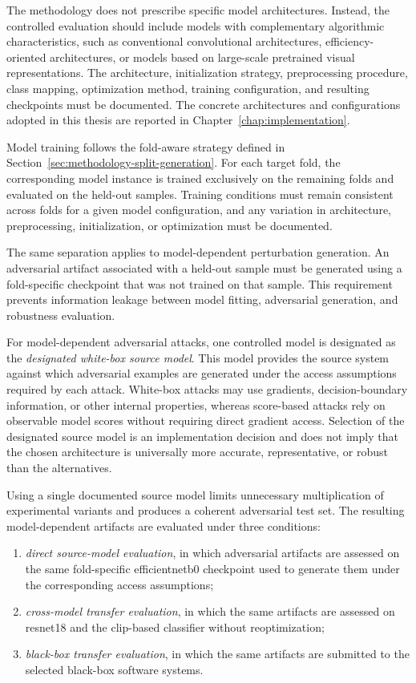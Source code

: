 The methodology does not prescribe specific model architectures. Instead, the
controlled evaluation should include models with complementary algorithmic
characteristics, such as conventional convolutional architectures,
efficiency-oriented architectures, or models based on large-scale pretrained
visual representations. The architecture, initialization strategy,
preprocessing procedure, class mapping, optimization method, training
configuration, and resulting checkpoints must be documented. The concrete
architectures and configurations adopted in this thesis are reported in
Chapter~\ref{chap:implementation}.

Model training follows the fold-aware strategy defined in
Section~\ref{sec:methodology-split-generation}. For each target fold, the
corresponding model instance is trained exclusively on the remaining folds and
evaluated on the held-out samples. Training conditions must remain consistent
across folds for a given model configuration, and any variation in
architecture, preprocessing, initialization, or optimization must be
documented.

The same separation applies to model-dependent perturbation generation. An
adversarial artifact associated with a held-out sample must be generated using
a fold-specific checkpoint that was not trained on that sample. This
requirement prevents information leakage between model fitting, adversarial
generation, and robustness evaluation.

For model-dependent adversarial attacks, one controlled model is designated as
the \textit{designated white-box source model}. This model provides the source
system against which adversarial examples are generated under the access assumptions required
by each attack. White-box attacks may use gradients, decision-boundary
information, or other internal properties, whereas score-based attacks rely on
observable model scores without requiring direct gradient access. Selection of
the designated source model is an implementation decision and does not imply that
the chosen architecture is universally more accurate, representative, or
robust than the alternatives.

Using a single documented source model limits unnecessary multiplication of
experimental variants and produces a coherent adversarial test set. The
resulting model-dependent artifacts are evaluated under three conditions:

\begin{enumerate}
\item \textit{direct source-model evaluation}, in which adversarial artifacts
are assessed on the same fold-specific \gls{efficientnetb0} checkpoint used to generate
them under the corresponding access assumptions;

\item \textit{cross-model transfer evaluation}, in which the same artifacts
are assessed on \gls{resnet18} and the \gls{clip}-based classifier without reoptimization;

\item \textit{black-box transfer evaluation}, in which the same artifacts are
submitted to the selected black-box software systems.
\end{enumerate}

